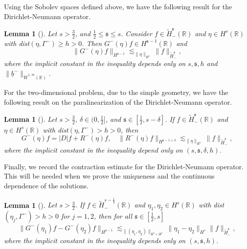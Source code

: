 \documentclass[12pt]{amsart}
\newtheorem{lemma}[theorem]{Lemma}
\theoremstyle{definition}
\numberwithin{equation}{section}
\newcommand{\R}{\mathbb{R}}
\newcommand{\f}{\frac}
\begin{document}
Using the Sobolev spaces defined above, we have the following result for the  Dirichlet-Neumann operator.

\begin{lemma} [\hspace{1sp}\cite{MR3260858, MR4090462}]
Let $s>\f32$, and $\f12 \leq \mathfrak{s} \leq s$.
Consider $f \in \widetilde{H}^\mathfrak{s}_- (\R)$ and $\eta \in H^s(\R)$ with dist$(\eta, \Gamma^-) \geq h>0$.
Then $G^-(\eta)f \in H^{\mathfrak{s}-1}(\R)$ and
\begin{equation} \label{GfEtaf}
 \|G^-(\eta)f \|_{H^{\mathfrak{s} -1}} \lesssim_{\|\eta\|_{H^s}}  \|f\|_{ \widetilde{H}^\mathfrak{s}_-},
\end{equation}
where the implicit constant in the inequality depends only on $s, \mathfrak{s}, h$ and $\| \underline{b}^-\|_{\dot{W}^{1,\infty}(\R)}$.
\end{lemma}

For the two-dimensional problem, due to the simple geometry, we have the following result on the paralinearization of the Dirichlet-Neumann operator.
\begin{lemma}[\hspace{1sp}\cite{MR3260858, MR4090462}]
Let $s>\f32$, $\delta \in (0, \f12]$, and $\mathfrak{s} \in [\f12, s-\delta]$.
If $f \in \widetilde{H}^\mathfrak{s}_- (\R)$ and $\eta \in H^s(\R)$ with dist$(\eta, \Gamma^-)>h>0$, then 
\begin{equation} \label{GfDRf}
G^-(\eta)f = |D|f + R^-(\eta)f, \quad \| R^-(\eta)f\|_{H^{\mathfrak{s} - 1+\delta}} \lesssim_{\|\eta\|_{H^s}} \|f\|_{\widetilde{H}^\mathfrak{s}_-},
\end{equation}
where the implicit constant in the inequality depend only on $(s, \mathfrak{s}, \delta, h)$. 
\end{lemma}

Finally, we record the contraction estimate for the Dirichlet-Neumann operator.
This will be needed when we prove the uniqueness and the continuous dependence of the solutions.
\begin{lemma}[\hspace{1sp}\cite{MR4090462}]
Let $s>\f32$.
If $f \in \widetilde{H}^{s-\f12}_- (\R)$ and $\eta_1, \eta_2 \in H^s(\R)$ with dist$(\eta_j, \Gamma^-)>h>0$ for $j = 1,2$, then for all $\mathfrak{s} \in [\f12, s]$
\begin{equation} \label{GetaDiff}
\| G^-(\eta_1)f - G^-(\eta_2)f\|_{H^{\mathfrak{s} - 1}} \lesssim_{\|(\eta_1, \eta_2)\|_{H^s \times H^s}}\|\eta_1 - \eta_2 \|_{H^s} \|f\|_{\widetilde{H}^{\mathfrak{s}}_-},
\end{equation}
where the implicit constant in the inequality depends only on $(s, \mathfrak{s}, h)$. 
\end{lemma}
\end{document}

